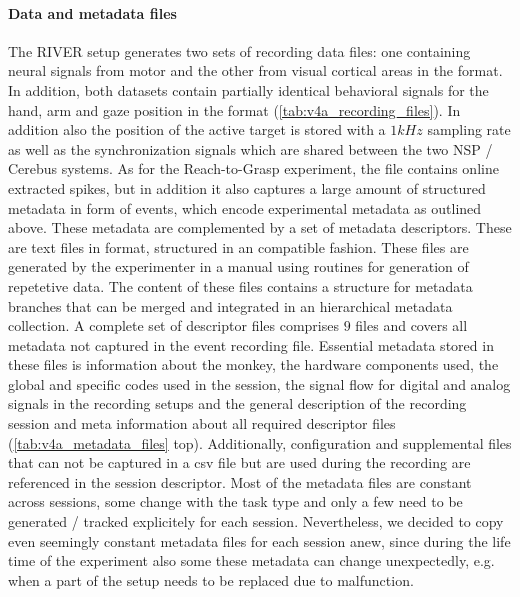 \paragraph{Data and metadata files}
The RIVER setup generates two sets of  recording data files: one containing neural signals from motor and the other from visual cortical areas in the  format. In addition, both datasets contain partially identical behavioral signals for the hand, arm and gaze position in the  format (\cref{tab:v4a_recording_files}). In addition also the position of the active target is stored with a $1kHz$ sampling rate as well as the synchronization signals which are shared between the two NSP / Cerebus systems.
As for the Reach-to-Grasp experiment, the  file contains online extracted spikes, but in addition it also captures a large amount of structured metadata in form of events, which encode experimental metadata as outlined above.
These metadata are complemented by a set of metadata descriptors. These are text files in  format, structured in an  compatible fashion. These files are generated by the experimenter in a manual using  routines for generation of repetetive data. The content of these files contains a structure for metadata branches that can be merged and integrated in an hierarchical  metadata collection. A complete set of descriptor files comprises $9$  files and covers all metadata not captured in the event recording file. Essential metadata stored in these  files is information about the monkey, the hardware components used, the global and specific codes used in the session, the signal flow for digital and analog signals in the recording setups and the general description of the recording session and meta information about all required descriptor files (\cref{tab:v4a_metadata_files} top). Additionally, configuration and supplemental files that can not be captured in a csv file but are used during the recording are referenced in the session descriptor. Most of the metadata files are constant across sessions, some change with the task type and only a few need to be generated / tracked explicitely for each session. Nevertheless, we decided to copy even seemingly constant metadata files for each session anew, since during the life time of the experiment also some these metadata can change unexpectedly, e.g. when a part of the setup needs to be replaced due to malfunction.



